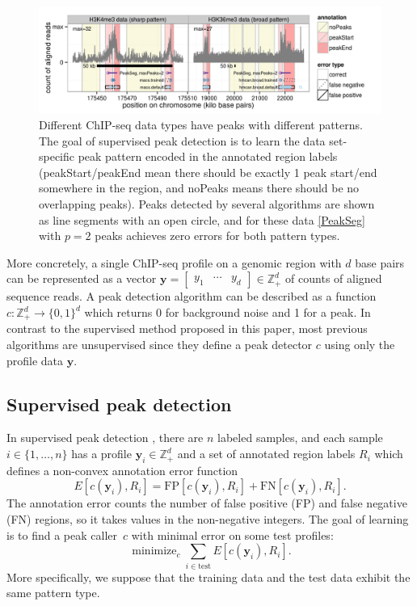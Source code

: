 \documentclass{article}
\DeclareMathOperator*{\minimize}{minimize}
\newcommand{\ZZ}{\mathbb Z}
\begin{document}
\begin{figure}[b!]
  \centering
  \includegraphics[width=\textwidth]{figure-dp-peaks-train}
  \vskip -0.5cm
  \caption{Different ChIP-seq data types have peaks with different
    patterns. The goal of supervised peak detection is to learn the
    data set-specific peak pattern encoded in the annotated region
    labels (peakStart/peakEnd mean there should be exactly 1 peak
    start/end somewhere in the region, and noPeaks means there should
    be no overlapping peaks). Peaks detected by several algorithms are
    shown as line segments with an open circle, and for these data
    \ref{PeakSeg} with $p=2$ peaks achieves zero errors for both
    pattern types.}
  \label{fig:dp-peaks-train}
\end{figure}

More concretely, a single ChIP-seq profile on a genomic region with
$d$ base pairs can be represented as a vector $\mathbf y= \left[
  \begin{array}{ccc}
    y_1 & \cdots & y_d
  \end{array}
\right]\in\ZZ_+^d$ of counts of aligned sequence reads. A peak
detection algorithm can be described as a function $c:\ZZ_+^d
\rightarrow \{0, 1\}^d$ which returns 0 for background noise and 1 for
a peak. In contrast to the
supervised method proposed in this paper, most previous algorithms are
unsupervised since they define a peak detector $c$ using only the
profile data $\mathbf y$.

\subsection{Supervised peak detection}

In supervised peak detection \citep{hocking2014visual}, there
are $n$ labeled samples, and each sample $i\in\{1, \dots, n\}$ has a
profile $\mathbf y_i\in\ZZ_+^d$ and a set of annotated region labels $R_i$
which defines a non-convex annotation error function
\begin{equation}
  \label{eq:error}
  E[c(\mathbf y_i),  R_i] =
  \text{FP}[c(\mathbf y_i), R_i] +
  \text{FN}[c(\mathbf y_i), R_i].
\end{equation}
The annotation error counts the number of false positive (FP) and
false negative (FN) regions, so it takes values in the non-negative
integers. The goal of learning is to find a peak caller~$c$ with
minimal error on some test profiles:
\begin{equation}
  \label{eq:min_error}
  \minimize_c \sum_{i\in\text{test}} E[c(\mathbf y_i),  R_i].
\end{equation}
More specifically, we suppose that the training data and the test data
exhibit the same pattern type.
\end{document}
